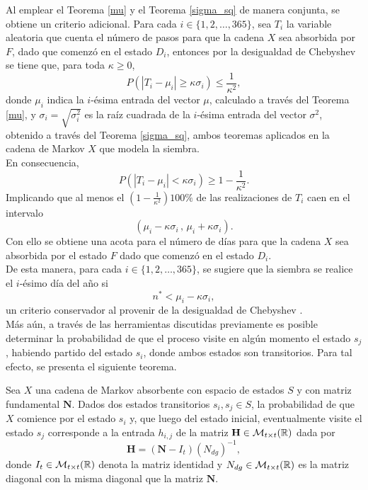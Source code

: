 Al emplear el Teorema \ref{mu} y el Teorema \ref{sigma_sq} de manera conjunta, se obtiene un criterio adicional. Para cada $i\in \{1,2,\ldots,365\}$, sea $T_i$ la variable aleatoria que cuenta el número de pasos para que la cadena $X$ sea absorbida por $F$, dado que comenzó en el estado $D_i$, entonces por la desigualdad de Chebyshev \cite{Ibe_2013} se tiene que, para toda $\kappa\geq 0$,\begin{equation}
	P(|T_i-\mu_i| \geq \kappa\sigma_i) \leq \frac{1}{\kappa^2},
\end{equation}donde $\mu_i$ indica la $i$-ésima entrada del vector $\mu$, calculado a través del Teorema \ref{mu}, y $\sigma_{i}=\sqrt{\sigma^2_i}$ es la raíz cuadrada de la $i$-ésima entrada del vector $\sigma^2$, obtenido a través del Teorema \ref{sigma_sq}, ambos teoremas aplicados en la cadena de Markov $X$ que modela la siembra.\\


En consecuencia, \begin{equation}
	P(|T_i-\mu_i| < \kappa\sigma_i) \geq 1-\frac{1}{\kappa^2}.
\end{equation}Implicando que al menos el $\displaystyle\left(1-\frac{1}{\kappa^2}\right)100\%$ de las realizaciones de $T_i$ caen en el intervalo \begin{equation}
(\mu_i- \kappa \sigma_i \,\mathbf{,}\, \mu_i+\kappa\sigma_i).
\end{equation}Con ello se obtiene una acota para el número de días para que la cadena $X$ sea absorbida por el estado $F$ dado que comenzó en el estado $D_i$.\\

De esta manera, para cada $i\in \{1,2,\ldots,365\}$, se sugiere que la siembra se realice el $i$-ésimo día del año si \begin{equation}
	n^* < \mu_i- \kappa \sigma_i,
\end{equation}un criterio conservador al provenir de la desigualdad de Chebyshev \cite{Jain_2022}.\\


Más aún, a través de las herramientas discutidas previamente es posible determinar la probabilidad de que el proceso visite en algún momento el estado $s_{j}$, habiendo partido del estado $s_i$, donde ambos estados son transitorios. Para tal efecto, se presenta el siguiente teorema.

\begin{theorem}
	Sea $X$ una cadena de Markov absorbente con espacio de estados $S$ y con matriz fundamental $\mathbf{N}$. Dados dos estados transitorios $s_i, s_j\in S$, la probabilidad de que $X$ comience por el estado $s_i$ y, que luego del estado inicial, eventualmente visite el estado $s_j$ corresponde a la entrada $h_{i,j}$ de la matriz $\mathbf{H}\in \mathcal{M}_{t\times t}(\mathbb{R})$ dada por \begin{equation}
		\mathbf{H}= (\mathbf{N}-I_t)(N_{dg})^{-1},
	\end{equation}
	donde $I_t\in \mathcal{M}_{t\times t}(\mathbb{R})$ denota la matriz identidad y $N_{dg}\in \mathcal{M}_{t\times t}(\mathbb{R})$ es la matriz diagonal con la misma diagonal que la matriz $\mathbf{N}$.
	\label{H_Eventual}
\end{theorem}

